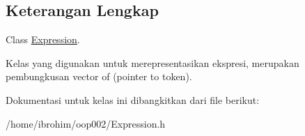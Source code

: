 \subsection{Keterangan Lengkap}
Class \hyperlink{classExpression}{Expression}. 

Kelas yang digunakan untuk merepresentasikan ekspresi, merupakan pembungkusan vector of (pointer to token). 

Dokumentasi untuk kelas ini dibangkitkan dari file berikut\+:\begin{DoxyCompactItemize}
\item 
/home/ibrohim/oop002/Expression.\+h\end{DoxyCompactItemize}
